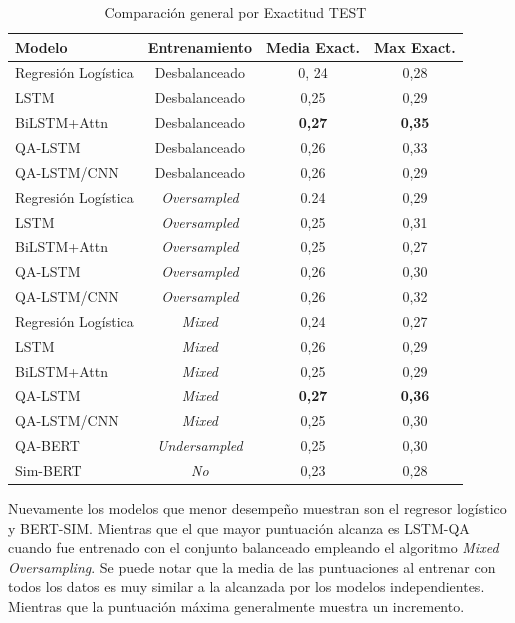 \begin{table}[!tb]
  \begin{center}
    \caption{Comparación general por Exactitud TEST}
    \begin{tabular}{l|c|c|c}
      \textbf{Modelo} & \textbf{Entrenamiento} & \textbf{Media Exact.} & \textbf{Max Exact.}\\
      \hline
      Regresión Logística & Desbalanceado & 0, 24 & 0,28\\
      LSTM & Desbalanceado & 0,25 & 0,29 \\
      BiLSTM+Attn & Desbalanceado & \textbf{0,27} & \textbf{0,35} \\
      QA-LSTM & Desbalanceado & 0,26 & 0,33 \\
      QA-LSTM/CNN & Desbalanceado & 0,26 & 0,29 \\

      Regresión Logística & \textit{Oversampled} & 0.24 & 0,29 \\
      LSTM & \textit{Oversampled} & 0,25 & 0,31 \\
      BiLSTM+Attn & \textit{Oversampled} & 0,25 & 0,27 \\
      QA-LSTM & \textit{Oversampled} & 0,26 & 0,30 \\
      QA-LSTM/CNN & \textit{Oversampled} & 0,26 & 0,32 \\

      Regresión Logística & \textit{Mixed} & 0,24 & 0,27 \\
      LSTM & \textit{Mixed} & 0,26 & 0,29 \\
      BiLSTM+Attn & \textit{Mixed} & 0,25 & 0,29 \\
      QA-LSTM & \textit{Mixed} & \textbf{0,27} & \textbf{0,36} \\
      QA-LSTM/CNN & \textit{Mixed} & 0,25 & 0,30 \\

      QA-BERT & \textit{Undersampled} & 0,25 & 0,30 \\
      Sim-BERT & \textit{No} & 0,23 & 0,28 \\
      
    \end{tabular}
  \end{center}
  \label{comparison_acc_general}
\end{table}

Nuevamente los modelos que menor desempeño muestran son el regresor logístico y BERT-SIM. Mientras que el que mayor puntuación alcanza es LSTM-QA cuando fue entrenado con el conjunto balanceado empleando el algoritmo \textit{Mixed Oversampling}. Se puede notar que la media de las puntuaciones al entrenar con todos los datos es muy similar a la alcanzada por los modelos independientes. Mientras que la puntuación máxima generalmente muestra un incremento.


